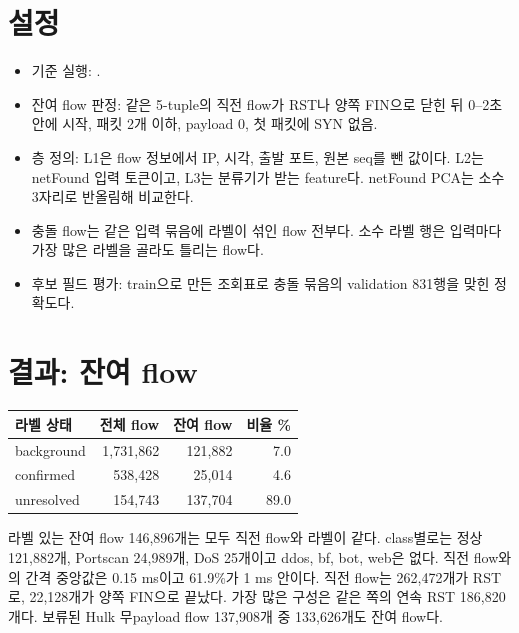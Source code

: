 \section{설정}
\begin{itemize}
\item 기준 실행: .
\item 잔여 flow 판정: 같은 5-tuple의 직전 flow가 RST나 양쪽 FIN으로 닫힌 뒤 0--2초 안에 시작, 패킷 2개 이하, payload 0, 첫 패킷에 SYN 없음.
\item 층 정의: L1은 flow 정보에서 IP, 시각, 출발 포트, 원본 seq를 뺀 값이다. L2는 netFound 입력 토큰이고, L3는 분류기가 받는 feature다. netFound PCA는 소수 3자리로 반올림해 비교한다.
\item 충돌 flow는 같은 입력 묶음에 라벨이 섞인 flow 전부다. 소수 라벨 행은 입력마다 가장 많은 라벨을 골라도 틀리는 flow다.
\item 후보 필드 평가: train으로 만든 조회표로 충돌 묶음의 validation 831행을 맞힌 정확도다.
\end{itemize}

\section{결과: 잔여 flow}
\begin{center}\small
\begin{tabular}{lrrr}
\toprule
라벨 상태 & 전체 flow & 잔여 flow & 비율 \%\\\midrule
background & 1,731,862 & 121,882 & 7.0\\
confirmed & 538,428 & 25,014 & 4.6\\
unresolved & 154,743 & 137,704 & 89.0\\
\bottomrule
\end{tabular}
\end{center}
라벨 있는 잔여 flow 146,896개는 모두 직전 flow와 라벨이 같다. class별로는 정상 121,882개, Portscan 24,989개, DoS 25개이고 ddos, bf, bot, web은 없다. 직전 flow와의 간격 중앙값은 0.15 ms이고 61.9\%가 1 ms 안이다. 직전 flow는 262,472개가 RST로, 22,128개가 양쪽 FIN으로 끝났다. 가장 많은 구성은 같은 쪽의 연속 RST 186,820개다. 보류된 Hulk 무payload flow 137,908개 중 133,626개도 잔여 flow다.

